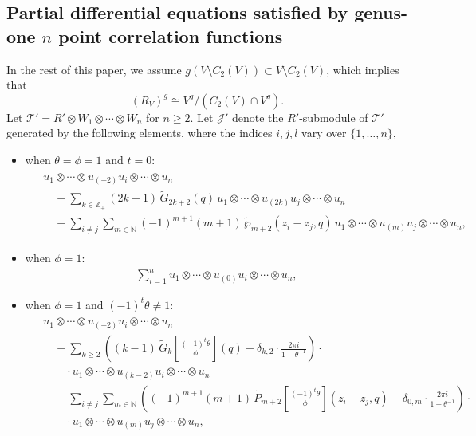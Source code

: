 \documentclass[9pt]{amsart}
\newcommand{\Z}{\mathbb{Z}}      %
\begin{document}
\subsection{Partial differential equations satisfied by genus-one \texorpdfstring{$n$}{Lg} point correlation functions}
In the rest of this paper, we assume $g(V \setminus C_2(V)) \subset V \setminus C_2(V)$, which implies that
\[
(R_V)^g \cong V^g / \left(C_2(V) \cap V^g\right).
\]
Let \( \mathcal{T}' = R' \otimes W_1 \otimes \cdots \otimes W_n \) for \( n \geq 2 \). Let \( \mathcal{J}' \) denote the \( R' \)-submodule of \( \mathcal{T}' \) generated by the following elements, where the indices \( i, j, l \) vary over \( \{1, \ldots, n\} \),
\begin{itemize}
    \item when $\theta = \phi = 1$ and $t = 0$:
   \begin{align} \label{11}
\begin{split}
    & u_1 \otimes \cdots \otimes u_{(-2)} u_i \otimes \cdots \otimes u_n \\
    &\quad + \sum_{k \in \Z_+} (2k + 1)\, \tilde{G}_{2k+2}(q)\,
    u_1 \otimes \cdots \otimes u_{(2k)} u_j \otimes \cdots \otimes u_n \\
    &\quad + \sum_{i \neq j} \sum_{m \in \mathbb{N}} (-1)^{m+1} (m + 1)\,
    \tilde{\wp}_{m+2}(z_i - z_j, q)\,
    u_1 \otimes \cdots \otimes u_{(m)} u_j \otimes \cdots \otimes u_n,
\end{split}
\end{align}

    \item when $\phi = 1$:
    \begin{align} \label{22}
    \sum_{i=1}^{n} u_1 \otimes \cdots \otimes u_{(0)}u_i \otimes \cdots \otimes u_n,
    \end{align}

    \item when $\phi = 1$ and $(-1)^t \theta \neq 1$:
   \begin{align} \label{33}
\begin{split}
    & u_1 \otimes \cdots \otimes u_{(-2)} u_i \otimes \cdots \otimes u_n \\
    &\quad + \sum_{k \geq 2} \left(
        (k - 1)\, \tilde{G}_{k} \genfrac[]{0pt}{0}{(-1)^t \theta}{\phi}(q)
        - \delta_{k,2} \cdot \frac{2\pi i}{1 - \theta^{-1}}
    \right) \cdot \\
    &\qquad \cdot u_1 \otimes \cdots \otimes u_{(k - 2)} u_i \otimes \cdots \otimes u_n \\
    &\quad - \sum_{i \neq j} \sum_{m \in \mathbb{N}} \left(
        (-1)^{m+1} (m + 1)\, \tilde{P}_{m + 2}
        \genfrac[]{0pt}{0}{(-1)^t \theta}{\phi}(z_i - z_j, q)
        - \delta_{0,m} \cdot \frac{2\pi i}{1 - \theta^{-1}}
    \right) \cdot \\
    &\qquad \cdot u_1 \otimes \cdots \otimes u_{(m)} u_j \otimes \cdots \otimes u_n,
\end{split}
\end{align}


\end{itemize}
\end{document}
